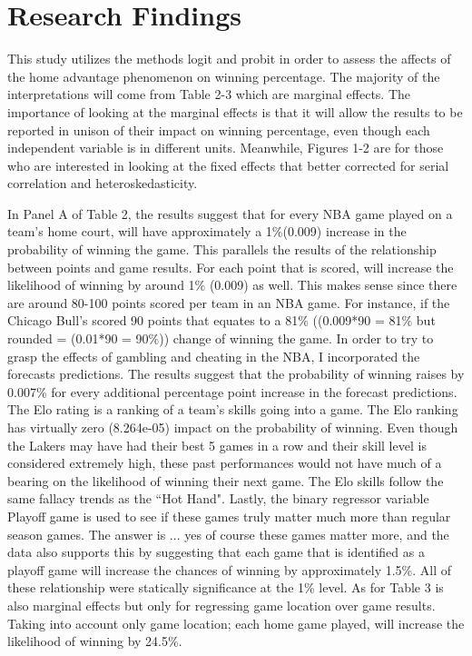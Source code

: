 \documentclass[12pt,english]{article}
\begin{document}
\section{Research Findings}\label{sec:results}
This study utilizes the methods logit and probit in order to assess the affects of the home advantage phenomenon on winning percentage. The majority of the interpretations will come from Table 2-3 which are marginal effects. The importance of looking at the marginal effects is that it will allow the results to be reported in unison of their impact on winning percentage, even though each independent variable is in different units. Meanwhile, Figures 1-2 are for those who are interested in looking at the fixed effects that better corrected for serial correlation and heteroskedasticity. 
\par In Panel A of Table 2, the results suggest that for every NBA game played on a team's home court, will have approximately a 1\%(0.009) increase in the probability of winning the game. This parallels the results of the relationship between points and game results. For each point that is scored, will increase the likelihood of winning by around 1\% (0.009) as well. This makes sense since there are around 80-100 points scored per team in an NBA game. For instance, if the Chicago Bull's scored 90 points that equates to a 81\% ((0.009*90 = 81\% but rounded = (0.01*90 = 90\%)) change of winning the game. In order to try to grasp the effects of gambling and cheating in the NBA, I incorporated the forecasts predictions. The results suggest that the probability of winning raises by 0.007\% for every additional percentage point increase in the forecast predictions. The Elo rating is a ranking of a team's skills going into a game. The Elo ranking has virtually zero (8.264e-05) impact on the probability of winning. Even though the Lakers may have had their best 5 games in a row and their skill level is considered extremely high, these past performances would not have much of a bearing on the likelihood of winning their next game. The Elo skills follow the same fallacy trends as the “Hot Hand". Lastly, the binary regressor variable Playoff game is used to see if these games truly matter much more than regular season games. The answer is ... yes of course these games matter more, and the data also supports this by suggesting that each game that is identified as a playoff game will increase the chances of winning by approximately 1.5\%. All of these relationship were statically significance at the 1\% level. As for Table 3 is also marginal effects but only for regressing game location over game results. Taking into account only game location; each home game played, will increase the likelihood of winning by 24.5\%.  
\end{document}
